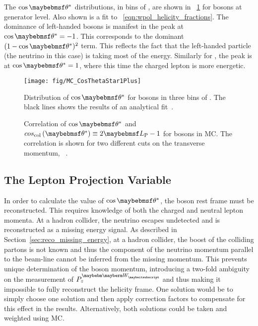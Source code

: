 The $\cos\thetastar$ distributions, in bins of \PtW, are shown in
\fig~\ref{fig:wpol_costheta} for \PWp bosons at generator level. Also shown is a
fit to \eqn~\ref{eqn:wpol_helicity_fractions}. The dominance of left-handed \PW
bosons is manifest in the peak at $\cos\thetastar = -1$. This corresponds to the
dominant $(1-\cos\thetastar)^2$ term. This reflects the fact that the
left-handed particle (the neutrino in this case) is taking most of the
energy. Similarly for \PWm, the peak is at $\cos\thetastar = 1$, where this time
the charged lepton is more energetic.

\begin{figure}[h!]
\centering
\texttt{[image: fig/MC\_CosThetaStar1Plus]}
\caption[Distribution of $\cos\thetastar$ for \PWp bosons in three bins of
\PtW.]{Distribution of $\cos\thetastar$ for \PWp bosons in three bins of \PtW. The black lines shows the results of an analytical fit~\cite{wpol_an}.}
\label{fig:wpol_costheta}
\end{figure}

\begin{figure}[h!]
\centering
{}\quad
\subfloat[[$\PtW > \unit{400}{\GeV}$]{
  \label{fig:wpol_costheta_corr400}\texttt{[image: fig/LP\_corr400]}}\quad
\caption[Correlation of $\cos\thetastar$ and $2\LP - 1$ for \PW bosons in
\acs{MC}]{Correlation of $\cos\thetastar$ and $cos_{\textrm{col}}\left(\thetastar\right) \equiv 2\LP -
  1$ for \PW bosons in \ac{MC}. The correlation is shown for two different cuts
  on the transverse momentum, \PtW~\cite{wpol_an}.}
\label{fig:wpol_costheta_corr}
\end{figure}

\subsection{The Lepton Projection Variable}
\label{sec:wpol_lp}
In order to calculate the value of $\cos\thetastar$, the \PW boson rest frame
must be reconstructed. This requires knowledge of both the charged and neutral
lepton momenta. At a hadron collider, the neutrino escapes undetected and is
reconstructed as a missing energy signal. As described in
Section~\ref{sec:reco_missing_energy}, at a hadron collider, the boost of the
colliding partons is not known and thus the component of the neutrino momentum
parallel to the beam-line cannot be inferred from the missing momentum. This
prevents unique determination of the \PW boson momentum, introducing a two-fold
ambiguity on the measurement of $P^{\PW}_z$ and thus making it impossible to
fully reconstruct the helicity frame. One solution would be to simply choose one
solution and then apply correction factors to compensate for this effect in the
results. Alternatively, both solutions could be taken and weighted using \ac{MC}.

